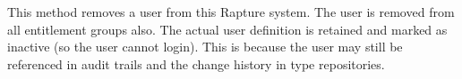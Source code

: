 This method removes a user from this Rapture system. The user is removed from all entitlement groups also. The actual
user definition is retained and marked as inactive (so the user cannot login). This is because the user may still be
referenced in audit trails and the change history in type repositories.
